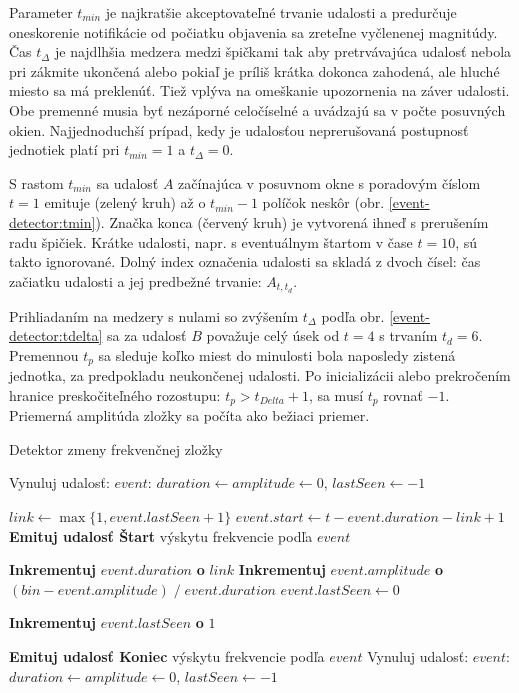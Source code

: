 Parameter $t_{min}$ je najkratšie akceptovateľné trvanie udalosti a predurčuje oneskorenie notifikácie od počiatku objavenia sa zreteľne 
vyčlenenej magnitúdy. Čas $t_{\Delta}$ je najdlhšia medzera medzi špičkami tak aby pretrvávajúca udalosť nebola pri zákmite ukončená alebo 
pokiaľ je príliš krátka dokonca zahodená, ale hluché miesto sa má preklenúť. Tiež vplýva na omeškanie upozornenia na záver udalosti.
Obe premenné musia byť nezáporné celočíselné a uvádzajú sa v počte posuvných okien. Najjednoduchší prípad, kedy je udalosťou
neprerušovaná postupnosť jednotiek platí pri $t_{min} = 1$ a $t_{\Delta} = 0$.

S rastom $t_{min}$ sa udalosť $A$ začínajúca v posuvnom okne s poradovým číslom
$t = 1$ emituje (zelený kruh) až o $t_{min} - 1$ políčok neskôr (obr. \ref{event-detector:tmin}). 
Značka konca (červený kruh) je vytvorená ihneď s prerušením radu špičiek. Krátke udalosti, napr. s eventuálnym štartom 
v čase $t = 10$, sú takto ignorované. Dolný index označenia udalosti sa skladá z dvoch čísel: čas začiatku udalosti a jej predbežné
trvanie: $A_{t,t_d}$.

Prihliadaním na medzery s nulami so zvýšením $t_{\Delta}$ podľa obr. \ref{event-detector:tdelta} sa za udalosť $B$ 
považuje celý úsek od $t = 4$ s trvaním $t_d = 6$. Premennou $t_p$ sa sleduje koľko miest do minulosti bola naposledy
zistená jednotka, za predpokladu neukončenej udalosti. Po inicializácii alebo prekročením hranice preskočiteľného 
rozostupu: $t_p > t_{Delta} + 1$, sa musí $t_p$ rovnať $-1$. Priemerná amplitúda zložky sa počíta ako bežiaci priemer.
\begin{algorithm}[h]
\caption{Detektor zmeny frekvenčnej zložky}
\begin{algorithmic}[1]
	\State Vynuluj udalosť: $event$: $duration \gets amplitude \gets 0$, $lastSeen \gets -1$
\EndIf

	\State $link \gets \max\{1, event.lastSeen + 1\}$
		\State $event.start \gets t - event.duration - link + 1$
		\State \textbf{Emituj udalosť Štart} výskytu frekvencie podľa $event$
	\EndIf
	
	\State \textbf{Inkrementuj} $event.duration$ \textbf{o} $link$
	\State \textbf{Inkrementuj} $event.amplitude$ \textbf{o} $(bin - event.amplitude)\;/\;event.duration$
	\State $event.lastSeen \gets 0$

	\State \textbf{Inkrementuj} $event.lastSeen$ \textbf{o}  $1$

        		\State \textbf{Emituj udalosť Koniec} výskytu frekvencie podľa $event$
        	\EndIf
        \Else
        	\State Vynuluj udalosť: $event$: $duration \gets amplitude \gets 0$, $lastSeen \gets -1$
        \EndIf
\EndIf
\end{algorithmic}
\label{algo:event-detector}
\end{algorithm}

